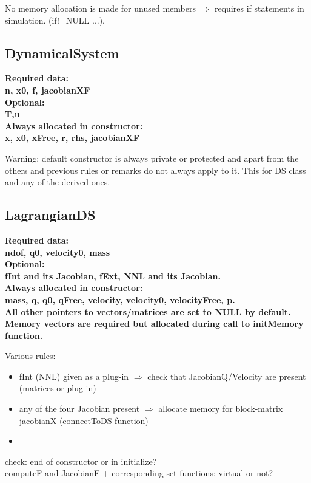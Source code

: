 \documentclass[10pt]{article}
\begin{document}
No memory allocation is made for unused members $\Rightarrow$ requires if statements in simulation.  (if!=NULL ...).\\

\subsection{DynamicalSystem}

\bf{Required data:}\\
n, x0, f, jacobianXF \\
\bf{Optional:}\\
T,u \\

\bf{Always allocated in constructor:} \\
x, x0, xFree, r, rhs, jacobianXF

Warning: default constructor is always private or protected and apart from the others and previous rules or remarks do not always apply to it. 
This for DS class and any of the derived ones. 

\subsection{LagrangianDS}

\bf{Required data:}\\
ndof, q0, velocity0, mass \\
\bf{Optional:}\\
fInt and its Jacobian, fExt, NNL and its Jacobian. \\

\bf{Always allocated in constructor:} \\
mass, q, q0, qFree, velocity, velocity0, velocityFree, p. \\
All other pointers to vectors/matrices are set to NULL by default. \\
Memory vectors are required but allocated during call to initMemory function. 

Various rules:
\begin{itemize}
\item fInt (NNL) given as a plug-in $\Rightarrow$ check that JacobianQ/Velocity are present (matrices or plug-in)
\item any of the four Jacobian present $\Rightarrow$ allocate memory for block-matrix jacobianX  (connectToDS function)
\item 
\end{itemize}

check: end of constructor or in initialize? \\
computeF and JacobianF + corresponding set functions: virtual or not? \\
\end{document}
